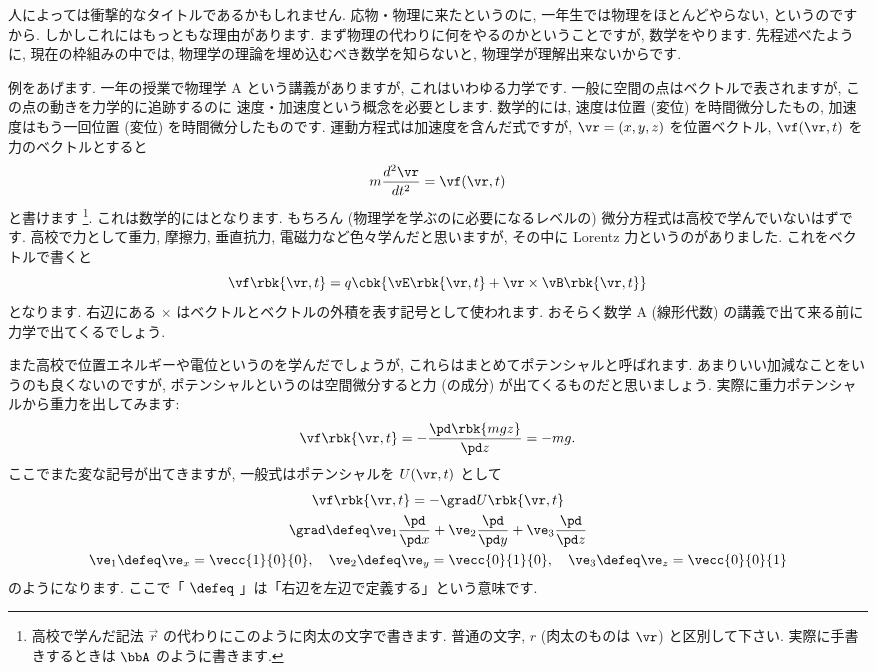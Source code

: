\documentclass[openany, a4paper, oneside]{jsbook}
\begin{document}
人によっては衝撃的なタイトルであるかもしれません.
応物・物理に来たというのに, 一年生では物理をほとんどやらない, というのですから.
しかしこれにはもっともな理由があります.
まず物理の代わりに何をやるのかということですが, 数学をやります.
先程述べたように, 現在の枠組みの中では,
物理学の理論を埋め込むべき数学を知らないと, 物理学が理解出来ないからです.

例をあげます.
一年の授業で物理学 A という講義がありますが, これはいわゆる力学です.
一般に空間の点はベクトルで表されますが, この点の動きを力学的に追跡するのに
速度・加速度という概念を必要とします.
数学的には, 速度は位置 (変位) を時間微分したもの,
加速度はもう一回位置 (変位) を時間微分したものです.
運動方程式は加速度を含んだ式ですが,
$\vr = (x, y, z)$ を位置ベクトル,
$\vf (\vr, t)$ を力のベクトルとすると
\begin{equation}
 m\frac{d^{2}\vr}{dt^{2}}=\vf (\vr, t)
\end{equation}
と書けます \footnote{高校で学んだ記法 $\vec{r}$ の代わりにこのように肉太の文字で書きます.
普通の文字, $r$ (肉太のものは $\vr$) と区別して下さい.
実際に手書きするときは $\bbA$ のように書きます.}.
これは数学的にはとなります.
もちろん (物理学を学ぶのに必要になるレベルの) 微分方程式は高校で学んでいないはずです.
高校で力として重力, 摩擦力, 垂直抗力, 電磁力など色々学んだと思いますが,
その中に Lorentz 力というのがありました.
これをベクトルで書くと
\begin{equation}
 \vf \rbk{\vr,t } = q \cbk{ \vE  \rbk{ \vr ,t } + \vr \times \vB \rbk{\vr,t } }
\end{equation}
となります.
右辺にある $\times$ はベクトルとベクトルの外積を表す記号として使われます.
おそらく数学 A (線形代数) の講義で出て来る前に力学で出てくるでしょう.

また高校で位置エネルギーや電位というのを学んだでしょうが,
これらはまとめてポテンシャルと呼ばれます.
あまりいい加減なことをいうのも良くないのですが,
ポテンシャルというのは空間微分すると力 (の成分) が出てくるものだと思いましょう.
実際に重力ポテンシャルから重力を出してみます:
\begin{equation}
 \vf \rbk{ \vr,t } = - \frac{ \pd \rbk{ mgz }}{ \pd z} = -mg.
\end{equation}
ここでまた変な記号が出てきますが, 一般式はポテンシャルを $U ( \vr,t)$ として
\begin{gather}
 \vf \rbk{ \vr,t }
 =
 -\grad U \rbk{ \vr,t } \\
 \grad
 \defeq
 \ve_{1} \frac{ \pd }{\pd x} + \ve_{2} \frac{ \pd }{\pd y}
        +\ve_{3} \frac{ \pd }{\pd z} \\
 \ve_{1}
 \defeq
 \ve_{x}
 =
 \vecc{1}{0}{0}
 , \quad
 \ve_{2}
 \defeq
 \ve_{y}
 =
 \vecc{0}{1}{0}, \quad \ve_3
 \defeq
 \ve_{z}
 =
 \vecc{0}{0}{1}
\end{gather}
のようになります.
ここで「 $\defeq$ 」は「右辺を左辺で定義する」という意味です.
\end{document}
